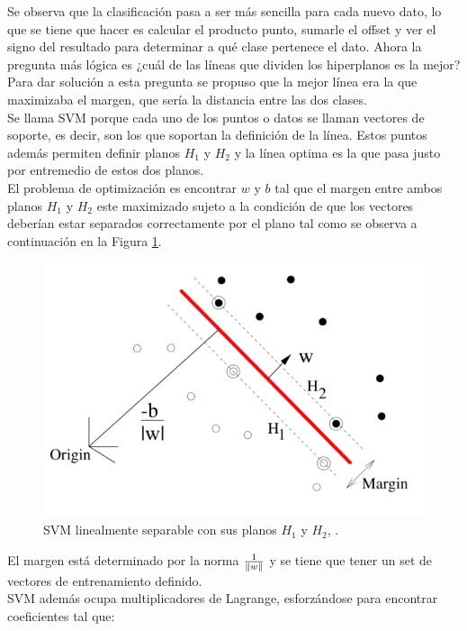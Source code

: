 \documentclass[letterpaper,12pt]{article}
\begin{document}
Se observa que la clasificación pasa a ser más sencilla para cada nuevo dato, lo que se tiene que hacer es calcular el producto punto, sumarle el offset y ver el signo del resultado para determinar a qué clase pertenece el dato. Ahora la pregunta más lógica es ¿cuál de las líneas que dividen los hiperplanos es la mejor?
Para dar solución a esta pregunta se propuso que la mejor línea era la que maximizaba el margen, que sería la distancia entre las dos clases.\\
Se llama SVM porque cada uno de los puntos o datos se llaman vectores de soporte, es decir, son los que soportan la definición de la línea. Estos puntos además permiten definir planos $H_{1}$ y $H_{2}$ y la línea optima es la que pasa justo por entremedio de estos dos planos.\\
El problema de optimización es encontrar $w$ y $b$ tal que el margen entre ambos planos $H_{1}$ y $H_{2}$ este maximizado sujeto a la condición de que los vectores deberían estar separados correctamente por el plano tal como se observa a continuación en la Figura \ref{fig:SVM02}.

\begin{figure}[H]
\centering
\includegraphics[scale=0.5]{Figs/SVM02.png}
\caption{SVM linealmente separable con sus planos $H_{1}$ y $H_{2}$, \cite{SebastianGodoy}.}
\label{fig:SVM02}
\end{figure}

El margen está determinado por la norma $\frac{1}{\left\lVert w\right\rVert}$ y se tiene que tener un set de vectores de entrenamiento definido.\\
SVM además ocupa multiplicadores de Lagrange, esforzándose para encontrar coeficientes tal que:
\end{document}
